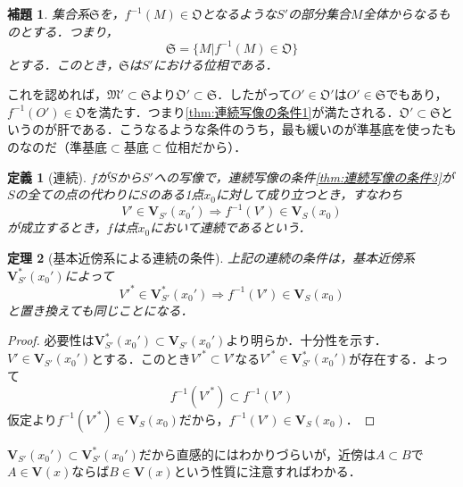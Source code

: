 \documentclass[a4paper,10pt,uplatex]{jsarticle}
\numberwithin{equation}{section}
\theoremstyle{mystyle}
\newtheorem{dfn}{定義}[section]
\newtheorem{thm}{定理}[section]
\newtheorem{lem}[thm]{補題}
\newcommand{\gM}{\mathfrak{M}}
\newcommand{\gO}{\mathfrak{O}}
\newcommand{\gS}{\mathfrak{S}}
\begin{document}
\begin{lem}
    集合系$\gS$を，$f^{-1}(M) \in \gO$となるような$S'$の部分集合$M$全体からなるものとする．つまり，
    \begin{equation}
        \gS = \{M | f^{-1}(M) \in \gO\}
    \end{equation}
    とする．このとき，$\gS$は$S'$における位相である．
\end{lem}
これを認めれば，$\gM' \subset \gS$より$\gO' \subset \gS$．したがって$O' \in \gO'$は$O' \in \gS$でもあり，$f^{-1}(O') \in \gO$を満たす．つまり\ref{thm:連続写像の条件1}が満たされる．$\gO' \subset \gS$というのが肝である．こうなるような条件のうち，最も緩いのが準基底を使ったものなのだ（$準基底 \subset 基底 \subset 位相$だから）．

\begin{dfn}[連続]
    $f$が$S$から$S'$への写像で，連続写像の条件\ref{thm:連続写像の条件3}が$S$の全ての点の代わりに$S$のある1点$x_0$に対して成り立つとき，すなわち
    \begin{equation}
        V' \in \bm{V}_{S'}(x_0') \Rightarrow f^{-1}(V') \in \bm{V}_S(x_0)
    \end{equation}
    が成立するとき，$f$は点$x_0$において連続であるという．
\end{dfn}

\begin{thm}[基本近傍系による連続の条件] \label{thm:基本近傍系による連続の条件}
    上記の連続の条件は，基本近傍系$\bm{V}_{S'}^*(x_0')$によって
    \begin{equation}
        V'^* \in \bm{V}_{S'}^*(x_0') \Rightarrow f^{-1}(V') \in \bm{V}_S(x_0)
    \end{equation}
    と置き換えても同じことになる．
\end{thm}

\begin{proof}
    必要性は$\bm{V}_{S'}^*(x_0') \subset \bm{V}_{S'}(x_0')$より明らか．十分性を示す．$V' \in \bm{V}_{S'}(x_0')$とする．このとき$V'^* \subset V'$なる$V'^* \in \bm{V}_{S'}^*(x_0')$が存在する．よって
    \begin{equation}
        f^{-1}(V'^*) \subset f^{-1}(V')
    \end{equation}
    仮定より$f^{-1}(V'^*) \in \bm{V}_{S}(x_0)$だから，$f^{-1}(V') \in \bm{V}_{S}(x_0)$．
\end{proof}
$\bm{V}_{S'}(x_0') \subset \bm{V}_{S'}^*(x_0')$だから直感的にはわかりづらいが，近傍は$A \subset B$で$A \in \bm{V}(x)$ならば$B \in \bm{V}(x)$という性質に注意すればわかる．
\end{document}
